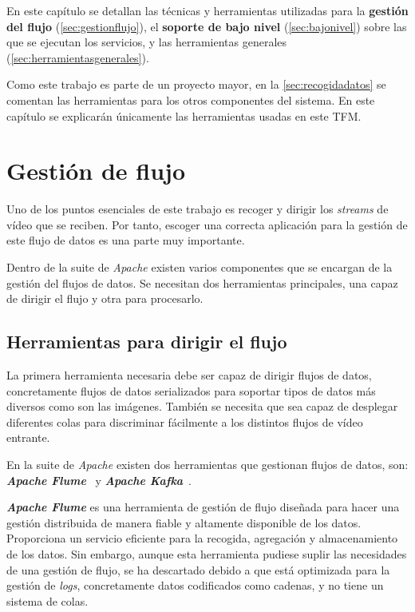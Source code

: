 
En este capítulo se detallan las técnicas y herramientas utilizadas para la \textbf{gestión del flujo} (\autoref{sec:gestionflujo}), el \textbf{soporte de bajo nivel} (\autoref{sec:bajonivel}) sobre las que se ejecutan los servicios, y las herramientas generales (\autoref{sec:herramientasgenerales}).

Como este trabajo es parte de un proyecto mayor, en la \autoref{sec:recogidadatos} se comentan las herramientas para los otros componentes del sistema. En este capítulo se explicarán únicamente las herramientas usadas en este TFM.

\section{Gestión de flujo}\label{sec:gestionflujo}

Uno de los puntos  esenciales de este trabajo es recoger y dirigir los \textit{streams} de vídeo que se reciben. Por tanto, escoger una correcta aplicación para la gestión de este flujo de datos es una parte muy importante.

Dentro de la suite de \textit{Apache} existen varios componentes que se encargan de la gestión del flujos de datos. Se necesitan dos herramientas principales, una capaz de dirigir el flujo y otra para procesarlo.

\subsection{Herramientas para dirigir el flujo}
La primera herramienta necesaria debe ser capaz de dirigir flujos de datos, concretamente flujos de datos serializados para soportar tipos de datos más diversos como son las imágenes. También se necesita que sea capaz de desplegar diferentes colas para discriminar fácilmente a los distintos flujos de vídeo entrante.

En la suite de \textit{Apache} existen dos herramientas que gestionan flujos de datos, son: \textit{\textbf{Apache Flume}}~\cite{noauthorapacheflume} y \textit{\textbf{Apache Kafka}}~\cite{noauthorapachenodate}.

\textit{\textbf{Apache Flume}} es una herramienta de gestión de flujo diseñada para hacer una gestión distribuida de manera fiable y altamente disponible de los datos. Proporciona un servicio eficiente para la recogida, agregación y almacenamiento de los datos. Sin embargo, aunque esta herramienta pudiese suplir las necesidades de una gestión de flujo, se ha descartado debido a que está optimizada para la gestión de \textit{logs}, concretamente datos codificados como cadenas, y no tiene un sistema de colas.

